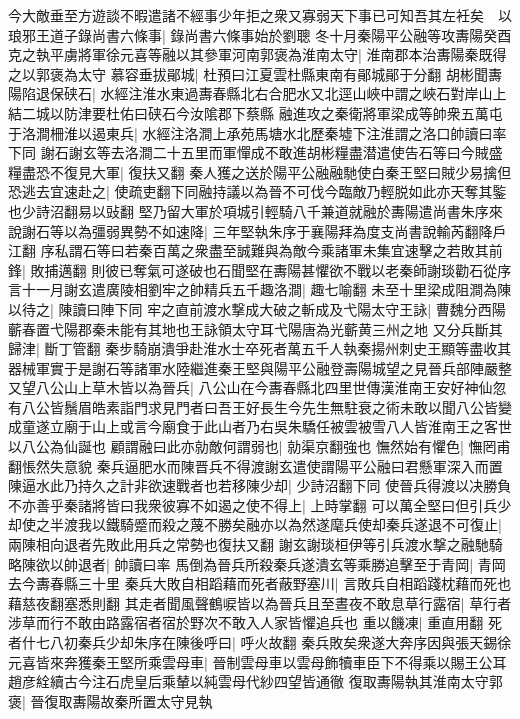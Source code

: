 今大敵垂至方遊談不暇遣諸不經事少年拒之衆又寡弱天下事已可知吾其左衽矣　以琅邪王道子錄尚書六條事|{
	錄尚書六條事始於劉聰}
冬十月秦陽平公融等攻夀陽癸酉克之執平虜將軍徐元喜等融以其參軍河南郭褒為淮南太守|{
	淮南郡本治夀陽秦既得之以郭褒為太守}
慕容垂拔鄖城|{
	杜預曰江夏雲杜縣東南有鄖城鄖于分翻}
胡彬聞夀陽陷退保硖石|{
	水經注淮水東過夀春縣北右合肥水又北逕山峽中謂之峽石對岸山上結二城以防津要杜佑曰硖石今汝隂郡下蔡縣}
融進攻之秦衛將軍梁成等帥衆五萬屯于洛澗柵淮以遏東兵|{
	水經注洛澗上承苑馬塘水北歷秦墟下注淮謂之洛口帥讀曰率下同}
謝石謝玄等去洛澗二十五里而軍憚成不敢進胡彬糧盡潜遣使告石等曰今賊盛糧盡恐不復見大軍|{
	復扶又翻}
秦人獲之送於陽平公融融馳使白秦王堅曰賊少易擒但恐逃去宜速赴之|{
	使疏吏翻下同融持議以為晉不可伐今臨敵乃輕脱如此亦天奪其鍳也少詩沼翻易以䜴翻}
堅乃留大軍於項城引輕騎八千兼道就融於夀陽遣尚書朱序來說謝石等以為彊弱異勢不如速降|{
	三年堅執朱序于襄陽拜為度支尚書說輸芮翻降戶江翻}
序私謂石等曰若秦百萬之衆盡至誠難與為敵今乘諸軍未集宜速擊之若敗其前鋒|{
	敗捕邁翻}
則彼已奪氣可遂破也石聞堅在夀陽甚懼欲不戰以老秦師謝琰勸石從序言十一月謝玄遣廣陵相劉牢之帥精兵五千趣洛澗|{
	趣七喻翻}
未至十里梁成阻澗為陳以待之|{
	陳讀曰陣下同}
牢之直前渡水撃成大破之斬成及弋陽太守王詠|{
	曹魏分西陽蘄春置弋陽郡秦未能有其地也王詠領太守耳弋陽唐為光蘄黄三州之地}
又分兵斷其歸津|{
	斷丁管翻}
秦步騎崩潰爭赴淮水士卒死者萬五千人執秦揚州刺史王顯等盡收其器械軍實于是謝石等諸軍水陸繼進秦王堅與陽平公融登壽陽城望之見晉兵部陣嚴整又望八公山上草木皆以為晉兵|{
	八公山在今夀春縣北四里世傳漢淮南王安好神仙忽有八公皆鬚眉皓素詣門求見門者曰吾王好長生今先生無駐衰之術未敢以聞八公皆變成童遂立廟于山上或言今廟食于此山者乃右吳朱驕任被雲被雪八人皆淮南王之客世以八公為仙誕也}
顧謂融曰此亦勍敵何謂弱也|{
	勍渠京翻強也}
憮然始有懼色|{
	憮罔甫翻悵然失意貌}
秦兵逼肥水而陳晋兵不得渡謝玄遣使謂陽平公融曰君懸軍深入而置陳逼水此乃持久之計非欲速戰者也若移陳少却|{
	少詩沼翻下同}
使晉兵得渡以决勝負不亦善乎秦諸將皆曰我衆彼寡不如遏之使不得上|{
	上時掌翻}
可以萬全堅曰但引兵少却使之半渡我以鐵騎蹙而殺之蔑不勝矣融亦以為然遂麾兵使却秦兵遂退不可復止|{
	兩陳相向退者先敗此用兵之常勢也復扶又翻}
謝玄謝琰桓伊等引兵渡水撃之融馳騎略陳欲以帥退者|{
	帥讀曰率}
馬倒為晉兵所殺秦兵遂潰玄等乘勝追擊至于青岡|{
	青岡去今夀春縣三十里}
秦兵大敗自相蹈藉而死者蔽野塞川|{
	言敗兵自相蹈踐枕藉而死也藉慈夜翻塞悉則翻}
其走者聞風聲鶴唳皆以為晉兵且至晝夜不敢息草行露宿|{
	草行者涉草而行不敢由路露宿者宿於野次不敢入人家皆懼追兵也}
重以饑凍|{
	重直用翻}
死者什七八初秦兵少却朱序在陳後呼曰|{
	呼火故翻}
秦兵敗矣衆遂大奔序因與張天錫徐元喜皆來奔獲秦王堅所乘雲母車|{
	晉制雲母車以雲母飾犢車臣下不得乘以賜王公耳趙彦絟續古今注石虎皇后乘輦以純雲母代紗四望皆通徹}
復取夀陽執其淮南太守郭褒|{
	晉復取夀陽故秦所置太守見執}
